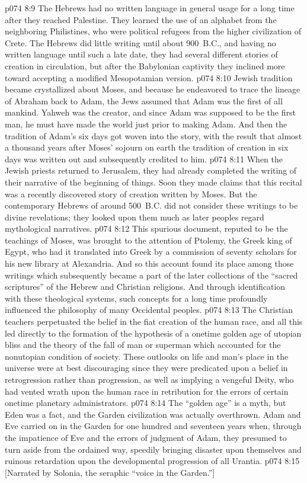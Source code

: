 \vs p074 8:9 The Hebrews had no written language in general usage for a long time after they reached Palestine. They learned the use of an alphabet from the neighboring Philistines, who were political refugees from the higher civilization of Crete. The Hebrews did little writing until about 900~B.C., and having no written language until such a late date, they had several different stories of creation in circulation, but after the Babylonian captivity they inclined more toward accepting a modified Mesopotamian version.
\vs p074 8:10 Jewish tradition became crystallized about Moses, and because he endeavored to trace the lineage of Abraham back to Adam, the Jews assumed that Adam was the first of all mankind. Yahweh was the creator, and since Adam was supposed to be the first man, he must have made the world just prior to making Adam. And then the tradition of Adam’s six days got woven into the story, with the result that almost a thousand years after Moses’ sojourn on earth the tradition of creation in six days was written out and subsequently credited to him.
\vs p074 8:11 When the Jewish priests returned to Jerusalem, they had already completed the writing of their narrative of the beginning of things. Soon they made claims that this recital was a recently discovered story of creation written by Moses. But the contemporary Hebrews of around 500~B.C. did not consider these writings to be divine revelations; they looked upon them much as later peoples regard mythological narratives.
\vs p074 8:12 This spurious document, reputed to be the teachings of Moses, was brought to the attention of Ptolemy, the Greek king of Egypt, who had it translated into Greek by a commission of seventy scholars for his new library at Alexandria. And so this account found its place among those writings which subsequently became a part of the later collections of the “sacred scriptures” of the Hebrew and Christian religions. And through identification with these theological systems, such concepts for a long time profoundly influenced the philosophy of many Occidental peoples.
\vs p074 8:13 The Christian teachers perpetuated the belief in the fiat creation of the human race, and all this led directly to the formation of the hypothesis of a onetime golden age of utopian bliss and the theory of the fall of man or superman which accounted for the nonutopian condition of society. These outlooks on life and man’s place in the universe were at best discouraging since they were predicated upon a belief in retrogression rather than progression, as well as implying a vengeful Deity, who had vented wrath upon the human race in retribution for the errors of certain onetime planetary administrators.
\pc \vs p074 8:14 The “golden age” is a myth, but Eden was a fact, and the Garden civilization was actually overthrown. Adam and Eve carried on in the Garden for one hundred and seventeen years when, through the impatience of Eve and the errors of judgment of Adam, they presumed to turn aside from the ordained way, speedily bringing disaster upon themselves and ruinous retardation upon the developmental progression of all Urantia.\plusone
\vsetoff
\vs p074 8:15 [Narrated by Solonia, the seraphic “voice in the Garden.”]
